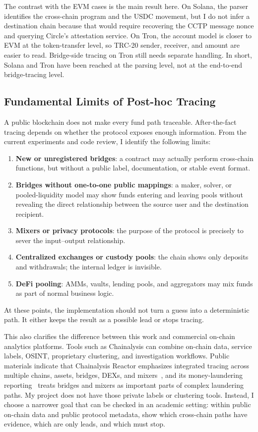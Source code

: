 \documentclass[12pt,a4paper]{article}
\begin{document}
The contrast with the EVM cases is the main result here. On Solana, the parser identifies the cross-chain program and the USDC movement, but I do not infer a destination chain because that would require recovering the CCTP message nonce and querying Circle's attestation service. On Tron, the account model is closer to EVM at the token-transfer level, so TRC-20 sender, receiver, and amount are easier to read. Bridge-side tracing on Tron still needs separate handling. In short, Solana and Tron have been reached at the parsing level, not at the end-to-end bridge-tracing level.

\subsection{Fundamental Limits of Post-hoc Tracing}
\label{sec:limits}

A public blockchain does not make every fund path traceable. After-the-fact tracing depends on whether the protocol exposes enough information. From the current experiments and code review, I identify the following limits:

\begin{enumerate}
    \item \textbf{New or unregistered bridges}: a contract may actually perform cross-chain functions, but without a public label, documentation, or stable event format.
    \item \textbf{Bridges without one-to-one public mappings}: a maker, solver, or pooled-liquidity model may show funds entering and leaving pools without revealing the direct relationship between the source user and the destination recipient.
    \item \textbf{Mixers or privacy protocols}: the purpose of the protocol is precisely to sever the input--output relationship.
    \item \textbf{Centralized exchanges or custody pools}: the chain shows only deposits and withdrawals; the internal ledger is invisible.
    \item \textbf{DeFi pooling}: AMMs, vaults, lending pools, and aggregators may mix funds as part of normal business logic.
\end{enumerate}

At these points, the implementation should not turn a guess into a deterministic path. It either keeps the result as a possible lead or stops tracing.

This also clarifies the difference between this work and commercial on-chain analytics platforms. Tools such as Chainalysis can combine on-chain data, service labels, OSINT, proprietary clustering, and investigation workflows. Public materials indicate that Chainalysis Reactor emphasizes integrated tracing across multiple chains, assets, bridges, DEXs, and mixers~\cite{chainalysisReactor2026}, and its money-laundering reporting~\cite{chainalysis2024} treats bridges and mixers as important parts of complex laundering paths. My project does not have those private labels or clustering tools. Instead, I choose a narrower goal that can be checked in an academic setting: within public on-chain data and public protocol metadata, show which cross-chain paths have evidence, which are only leads, and which must stop.
\end{document}
